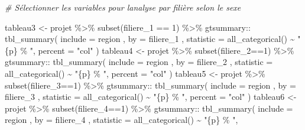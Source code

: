\documentclass[
  14pt,
]{article}
\newenvironment{Shaded}{\begin{snugshade}}{\end{snugshade}}
\newcommand{\AttributeTok}[1]{\textcolor[rgb]{0.77,0.63,0.00}{#1}}
\newcommand{\CommentTok}[1]{\textcolor[rgb]{0.56,0.35,0.01}{\textit{#1}}}
\newcommand{\DecValTok}[1]{\textcolor[rgb]{0.00,0.00,0.81}{#1}}
\newcommand{\FunctionTok}[1]{\textcolor[rgb]{0.00,0.00,0.00}{#1}}
\newcommand{\NormalTok}[1]{#1}
\newcommand{\OtherTok}[1]{\textcolor[rgb]{0.56,0.35,0.01}{#1}}
\newcommand{\SpecialCharTok}[1]{\textcolor[rgb]{0.00,0.00,0.00}{#1}}
\newcommand{\StringTok}[1]{\textcolor[rgb]{0.31,0.60,0.02}{#1}}
\begin{document}
\begin{Shaded}
\begin{Highlighting}[]
\CommentTok{\# Sélectionner les variables pour l\textquotesingle{}analyse par filière selon le sexe}

\NormalTok{tableau3 }\OtherTok{\textless{}{-}}\NormalTok{ projet }\SpecialCharTok{\%\textgreater{}\%}
  \FunctionTok{subset}\NormalTok{(filiere\_1 }\SpecialCharTok{==} \DecValTok{1}\NormalTok{) }\SpecialCharTok{\%\textgreater{}\%} 
\NormalTok{  gtsummary}\SpecialCharTok{::} \FunctionTok{tbl\_summary}\NormalTok{(}
    \AttributeTok{include =}\NormalTok{ region ,}
    \AttributeTok{by =}\NormalTok{ filiere\_1 ,}
    \AttributeTok{statistic =} \FunctionTok{all\_categorical}\NormalTok{() }\SpecialCharTok{\textasciitilde{}} \StringTok{"\{p\} \% "}\NormalTok{,}
    \AttributeTok{percent =} \StringTok{"col"}
\NormalTok{  ) }
\NormalTok{tableau4 }\OtherTok{\textless{}{-}}\NormalTok{ projet }\SpecialCharTok{\%\textgreater{}\%}
  \FunctionTok{subset}\NormalTok{(filiere\_2}\SpecialCharTok{==}\DecValTok{1}\NormalTok{) }\SpecialCharTok{\%\textgreater{}\%} 
\NormalTok{  gtsummary}\SpecialCharTok{::} \FunctionTok{tbl\_summary}\NormalTok{(}
    \AttributeTok{include =}\NormalTok{ region ,}
    \AttributeTok{by =}\NormalTok{ filiere\_2 ,}
    \AttributeTok{statistic =} \FunctionTok{all\_categorical}\NormalTok{() }\SpecialCharTok{\textasciitilde{}} \StringTok{"\{p\} \% "}\NormalTok{,}
    \AttributeTok{percent =} \StringTok{"col"}
\NormalTok{  ) }
\NormalTok{tableau5 }\OtherTok{\textless{}{-}}\NormalTok{ projet }\SpecialCharTok{\%\textgreater{}\%}
  \FunctionTok{subset}\NormalTok{(filiere\_3}\SpecialCharTok{==}\DecValTok{1}\NormalTok{) }\SpecialCharTok{\%\textgreater{}\%} 
\NormalTok{  gtsummary}\SpecialCharTok{::} \FunctionTok{tbl\_summary}\NormalTok{(}
    \AttributeTok{include =}\NormalTok{ region ,}
    \AttributeTok{by =}\NormalTok{ filiere\_3 ,}
    \AttributeTok{statistic =} \FunctionTok{all\_categorical}\NormalTok{() }\SpecialCharTok{\textasciitilde{}} \StringTok{"\{p\} \% "}\NormalTok{,}
    \AttributeTok{percent =} \StringTok{"col"}
\NormalTok{  ) }
\NormalTok{tableau6 }\OtherTok{\textless{}{-}}\NormalTok{ projet }\SpecialCharTok{\%\textgreater{}\%}
  \FunctionTok{subset}\NormalTok{(filiere\_4}\SpecialCharTok{==}\DecValTok{1}\NormalTok{) }\SpecialCharTok{\%\textgreater{}\%} 
\NormalTok{  gtsummary}\SpecialCharTok{::} \FunctionTok{tbl\_summary}\NormalTok{(}
    \AttributeTok{include =}\NormalTok{ region ,}
    \AttributeTok{by =}\NormalTok{ filiere\_4 ,}
    \AttributeTok{statistic =} \FunctionTok{all\_categorical}\NormalTok{() }\SpecialCharTok{\textasciitilde{}} \StringTok{"\{p\} \% "}\NormalTok{,}

\end{Highlighting}
\end{Shaded}
\end{document}
